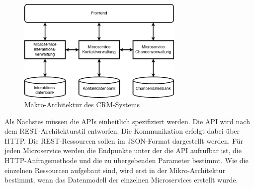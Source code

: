 \begin{figure}[H] 
    \centering
    \includegraphics[width=0.71\textwidth]{figures/CRMEntwurf.png}
    \caption{Makro-Architektur des \ac{CRM}-Systems}
    \label{fig:CRMENTWURF}
\end{figure}

Als Nächstes müssen die \acp{API} einheitlich spezifiziert werden. Die \ac{API} wird nach dem \ac{REST}-Architekturstil entworfen. Die Kommunikation erfolgt dabei über \ac{HTTP}. Die \ac{REST}-Ressourcen sollen im \ac{JSON}-Format dargestellt werden. Für jeden Microservice werden die Endpunkte unter der die API aufrufbar ist, die HTTP-Anfragemethode und die zu übergebenden Parameter bestimmt. Wie die einzelnen Ressourcen aufgebaut sind, wird erst in der Mikro-Architektur bestimmt, wenn das Datenmodell der einzelnen Microservices erstellt wurde.

